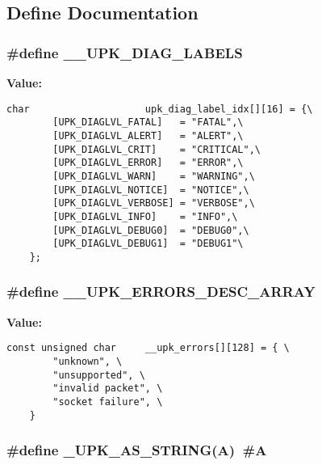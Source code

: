 \subsection{Define Documentation}
\subsubsection{\setlength{\rightskip}{0pt plus 5cm}\#define \bf{\_\-\_\-UPK\_\-DIAG\_\-LABELS}}\label{error_8h_e3df24716777b14eec390bf9ec0f1019}


\textbf{Value:}

\begin{Code}\begin{verbatim}char                    upk_diag_label_idx[][16] = {\
        [UPK_DIAGLVL_FATAL]   = "FATAL",\
        [UPK_DIAGLVL_ALERT]   = "ALERT",\
        [UPK_DIAGLVL_CRIT]    = "CRITICAL",\
        [UPK_DIAGLVL_ERROR]   = "ERROR",\
        [UPK_DIAGLVL_WARN]    = "WARNING",\
        [UPK_DIAGLVL_NOTICE]  = "NOTICE",\
        [UPK_DIAGLVL_VERBOSE] = "VERBOSE",\
        [UPK_DIAGLVL_INFO]    = "INFO",\
        [UPK_DIAGLVL_DEBUG0]  = "DEBUG0",\
        [UPK_DIAGLVL_DEBUG1]  = "DEBUG1"\
    };
\end{verbatim}\end{Code}
\subsubsection{\setlength{\rightskip}{0pt plus 5cm}\#define \bf{\_\-\_\-UPK\_\-ERRORS\_\-DESC\_\-ARRAY}}\label{error_8h_b325d5e5ff1d063c048427fd4af5b78c}


\textbf{Value:}

\begin{Code}\begin{verbatim}const unsigned char     __upk_errors[][128] = { \
        "unknown", \
        "unsupported", \
        "invalid packet", \
        "socket failure", \
    }
\end{verbatim}\end{Code}
\subsubsection{\setlength{\rightskip}{0pt plus 5cm}\#define \_\-UPK\_\-AS\_\-STRING(A)~\#A}\label{error_8h_c51a92dbe33ebab99358c47755483c7f}


